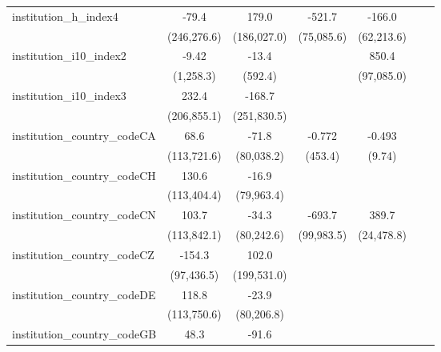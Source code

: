 \begin{tabular}{lcccccc}
   institution\_h\_index4                & -79.4       & 179.0       & -521.7      & -166.0      &       &   \\   
                                         & (246,276.6) & (186,027.0) & (75,085.6)  & (62,213.6)  &       &   \\   
   institution\_i10\_index2              & -9.42       & -13.4       &             & 850.4       &       &   \\   
                                         & (1,258.3)   & (592.4)     &             & (97,085.0)  &       &   \\   
   institution\_i10\_index3              & 232.4       & -168.7      &             &             &       &   \\   
                                         & (206,855.1) & (251,830.5) &             &             &       &   \\   
   institution\_country\_codeCA          & 68.6        & -71.8       & -0.772      & -0.493      &       &   \\   
                                         & (113,721.6) & (80,038.2)  & (453.4)     & (9.74)      &       &   \\   
   institution\_country\_codeCH          & 130.6       & -16.9       &             &             &       &   \\   
                                         & (113,404.4) & (79,963.4)  &             &             &       &   \\   
   institution\_country\_codeCN          & 103.7       & -34.3       & -693.7      & 389.7       &       &   \\   
                                         & (113,842.1) & (80,242.6)  & (99,983.5)  & (24,478.8)  &       &   \\   
   institution\_country\_codeCZ          & -154.3      & 102.0       &             &             &       &   \\   
                                         & (97,436.5)  & (199,531.0) &             &             &       &   \\   
   institution\_country\_codeDE          & 118.8       & -23.9       &             &             &       &   \\   
                                         & (113,750.6) & (80,206.8)  &             &             &       &   \\   
   institution\_country\_codeGB          & 48.3        & -91.6       &             &             &       &   \\   

\end{tabular}
